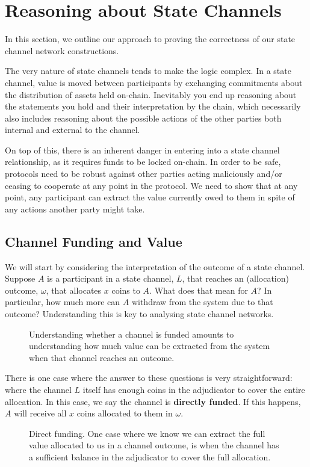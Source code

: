\section{Reasoning about State Channels}\label{sec:reasoning}

In this section, we outline our approach to proving the correctness of our state channel network constructions.

The very nature of state channels tends to make the logic complex.
In a state channel, value is moved between participants by exchanging commitments about the distribution of assets held on-chain.
Inevitably you end up reasoning about the statements you hold and their interpretation by the chain, which necessarily also includes reasoning about the possible actions of the other parties both internal and external to the channel.

On top of this, there is an inherent danger in entering into a state channel relationship, as it requires funds to be locked on-chain.
In order to be safe, protocols need to be robust against other parties acting maliciously and/or ceasing to cooperate at any point in the protocol.
We need to show that at any point, any participant can extract the value currently owed to them in spite of any actions another party might take.

\subsection{Channel Funding and Value}

We will start by considering the interpretation of the outcome of a state channel.
Suppose $A$ is a participant in a state channel, $L$, that reaches an (allocation) outcome, $\omega$, that allocates $x$ coins to $A$.
What does that mean for $A$?
In particular, how much more can $A$ withdraw from the system due to that outcome?
Understanding this is key to analysing state channel networks.

\begin{figure}[h]\centering
  \makebox[\textwidth][c]{}
  \caption{
    Understanding whether a channel is funded amounts to understanding how much value can be extracted from the system when that channel reaches an outcome.
  }\label{fig:meaning-of-funding}
\end{figure}

There is one case where the answer to these questions is very straightforward:
where the channel $L$ itself has enough coins in the adjudicator to cover the entire allocation.
In this case, we say the channel is \textbf{directly funded}.
If this happens, $A$ will receive all $x$ coins allocated to them in $\omega$.
\begin{figure}[h]\centering
  \makebox[\textwidth][c]{}
  \caption{
    Direct funding.
    One case where we know we can extract the full value allocated to us in a channel outcome, is when the channel has a sufficient balance in the adjudicator to cover the full allocation.
  }\label{fig:direct-funding}
\end{figure}

